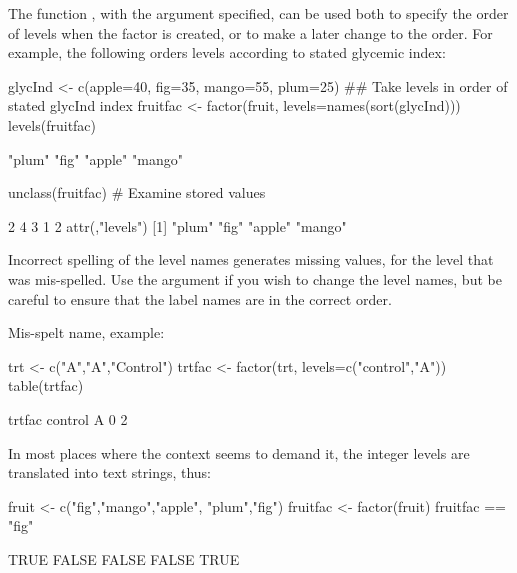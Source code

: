 The function , with the  argument
specified, can be used both to specify the order of levels when the
factor is created, or to make a later change to the
order.  For example, the following
orders levels according to stated glycemic index:
\begin{Schunk}
\begin{Sinput}
glycInd <- c(apple=40, fig=35, mango=55, plum=25)
## Take levels in order of stated glycInd index
fruitfac <- factor(fruit,
                   levels=names(sort(glycInd)))
levels(fruitfac)
\end{Sinput}
\begin{Soutput}
[1] "plum"  "fig"   "apple" "mango"
\end{Soutput}
\begin{Sinput}
unclass(fruitfac)  # Examine stored values
\end{Sinput}
\begin{Soutput}
[1] 2 4 3 1 2
attr(,"levels")
[1] "plum"  "fig"   "apple" "mango"
\end{Soutput}
\end{Schunk}

Incorrect spelling of the level names generates missing values, for
the level that was mis-spelled.  Use the  argument if you
wish to change the level names, but be careful to ensure that the
label names are in the correct order.
\begin{marginfigure}[-36pt]
Mis-spelt name, example:
\begin{Schunk}
\begin{Sinput}
trt <- c("A","A","Control")
trtfac <- factor(trt,
  levels=c("control","A"))
table(trtfac)
\end{Sinput}
\begin{Soutput}
trtfac
control       A 
      0       2 
\end{Soutput}
\end{Schunk}
\end{marginfigure}

In most places where the context seems to demand it, the integer levels
are translated into text strings, thus:
\begin{Schunk}
\begin{Sinput}
fruit <- c("fig","mango","apple", "plum","fig")
fruitfac <- factor(fruit)
fruitfac == "fig"
\end{Sinput}
\begin{Soutput}
[1]  TRUE FALSE FALSE FALSE  TRUE
\end{Soutput}
\end{Schunk}


